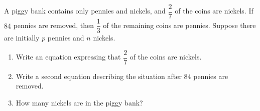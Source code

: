A piggy bank contains only pennies and nickels, and $\dfrac27$ of the coins are nickels. If $84$ pennies are removed, then $\dfrac13$ of the remaining coins are pennies. Suppose there are initially $p$ pennies and $n$ nickels.
\begin{enumerate}
\item[(a)] Write an equation expressing that $\dfrac27$ of the coins are nickels.
\item[(b)] Write a second equation describing the situation after $84$ pennies are removed.
\item[(c)] How many nickels are in the piggy bank?
\end{enumerate}
